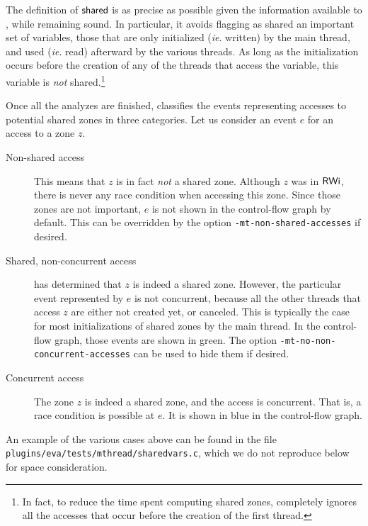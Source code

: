 \documentclass{frama-c-book}
\def\ie.{\emph{ie}.}
\begin{document}
\smallskip The definition of $\shared{}$ is as precise as possible given
the information available to \mthread,
while remaining sound. In particular, it avoids flagging as shared an
important set of variables, those that are only initialized (\ie. written)
by the main thread, and used (\ie. read) afterward by the various threads.
As long as the initialization occurs before the creation of any
of the threads that access the variable, this variable is \emph{not}
shared.\footnote{In fact, to reduce the time spent computing shared
zones, \mthread completely ignores all the accesses that occur before
the creation of the first thread.}

\smallskip

Once all the analyzes are finished, \mthread classifies the events
representing accesses to potential shared zones in three categories.
Let us consider an event $e$ for an access to a zone $z$.
\begin{description}

\item [Non-shared access]

  This means that $z$ is in fact \emph{not} a shared zone.
  Although $z$ was in $\mathsf{RWi}$, there is never any race condition
  when accessing this zone. Since those zones are not
  important, $e$ is not shown in the control-flow graph by default.
  This can be overridden by the option \verb+-mt-non-shared-accesses+
  if desired.

\item [Shared, non-concurrent access]

  \mthread has determined that $z$ is indeed a shared zone. However,
  the particular event represented by $e$ is not concurrent, because
  all the other threads that access $z$ are either not created yet, or
  canceled. This is typically the case for most initializations of
  shared zones by the main thread. In the control-flow graph,
  those events are shown in green. The option
  \verb+-mt-no-non-concurrent-accesses+ can be used to hide them if desired.

\item [Concurrent access]

  The zone $z$ is indeed a shared zone, and the access is concurrent.
  That is, a race condition is possible at $e$. It is shown in
  blue in the control-flow graph.
\end{description}
%
An example of the various cases above can be found in the file
\verb+plugins/eva/tests/mthread/sharedvars.c+,
which we do not reproduce below for space consideration.
\end{document}
